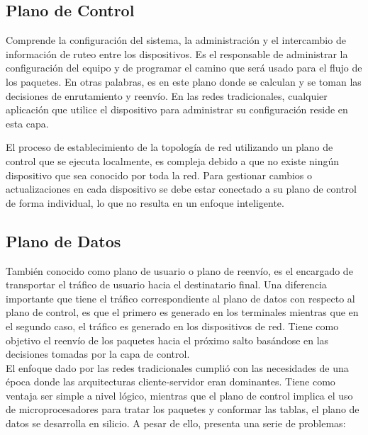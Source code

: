 \subsection{Plano de Control}
Comprende la configuración del sistema, la administración y el intercambio de información de ruteo entre los dispositivos. Es el responsable de administrar la configuración del equipo y de programar el camino que será usado para el flujo de los paquetes. En otras palabras, es en este plano donde se calculan y se toman las decisiones de enrutamiento y reenvío. En las redes tradicionales, cualquier aplicación que utilice el dispositivo para administrar su configuración reside en esta capa. 

El proceso de establecimiento de la topología de red utilizando un plano de control que se ejecuta localmente, es compleja debido a que no existe ningún dispositivo que sea conocido por toda la red. Para gestionar cambios o actualizaciones en cada dispositivo se debe estar conectado a su plano de control de forma individual, lo que no resulta en un enfoque inteligente.

\subsection{Plano de Datos}
También conocido como plano de usuario o plano de reenvío, es el encargado de transportar el tráfico de usuario hacia el destinatario final. Una diferencia importante que tiene el tráfico correspondiente al plano de datos con respecto al plano de control, es que el primero es generado en los terminales mientras que en el segundo caso, el tráfico es generado en los dispositivos de red. Tiene como objetivo el reenvío de los paquetes hacia el próximo salto basándose en las decisiones tomadas por la capa de control.
\\


El enfoque dado por las redes tradicionales cumplió con las necesidades de una época donde las arquitecturas cliente-servidor eran dominantes. Tiene como ventaja ser simple a nivel lógico, mientras que el plano de control implica el uso de microprocesadores para tratar los paquetes y conformar las tablas, el plano de datos se desarrolla en silicio. A pesar de ello, presenta una serie de problemas:


